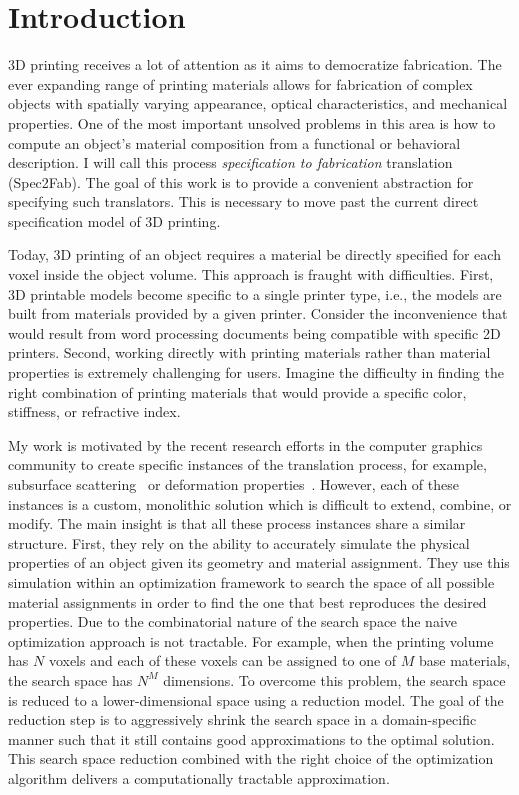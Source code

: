 
%
\chapter{Introduction}
\label{chap:intro}
%
3D printing receives a lot of attention as it aims to democratize fabrication.
The ever expanding range of printing materials allows for fabrication of complex objects with spatially varying appearance, optical characteristics, and mechanical properties.
One of the most important unsolved problems in this area is how to compute an object's material composition from a functional or behavioral description. I will call this process \emph {specification to fabrication} translation (Spec2Fab). 
The goal of this work is to provide a convenient abstraction for specifying such translators. This is necessary to move past the current direct specification model of 3D printing.

Today,  3D printing of an object requires a material be directly specified for each voxel inside the object volume. This approach is fraught with difficulties. First, 3D printable models become specific to a single printer type, i.e., the models are built from materials provided by a given printer. Consider the inconvenience that would result from  word processing documents being compatible with specific 2D printers. Second, working directly with printing materials rather than material properties is extremely challenging for users. Imagine the difficulty in finding the right combination of printing materials that would provide a specific color, stiffness, or refractive index.

My work is motivated by the recent research efforts in the computer graphics community to create specific instances of the translation process, for example, subsurface scattering~\cite{Hasan:2010:PRO,Dong:2010:FSS} or deformation properties~\cite{Bickel:2010:DAF}. However, each of these instances is a custom, monolithic solution which is difficult to extend, combine, or modify. The main insight is that all these process instances share a similar structure. First, they rely on the ability to accurately simulate the physical properties of an object given its geometry and material assignment. They use this simulation within an optimization framework to search the space of all possible material assignments in order to find the one that best reproduces the desired properties. Due to the combinatorial nature of the search space the naive optimization approach is not tractable. For example, when the printing volume has $N$ voxels and each of these voxels can be assigned to one of $M$ base materials, the search space has $N^M$ dimensions. To overcome this problem, the search space is reduced to a lower-dimensional space using a reduction model. The goal of the reduction step is to aggressively shrink the search space in a domain-specific manner such that it still contains good approximations to the optimal solution. This search space reduction combined with the right choice of the optimization algorithm delivers a computationally tractable approximation.

